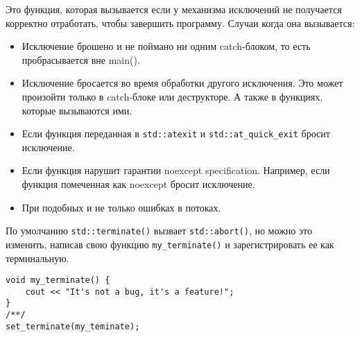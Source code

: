 Это функция, которая вызывается если у механизма исключений не получается корректно отработать, чтобы завершить программу.
Случаи когда она вызывается:
\begin{itemize}
\item Исключение брошено и не поймано ни одним catch-блоком, то есть пробрасывается вне main().
\item Исключение бросается во время обработки другого исключения. Это может произойти только в catch-блоке или деструкторе. А также в функциях, которые вызываются ими.
\item Если функция переданная в \texttt{std::atexit} и \texttt{std::at_quick_exit} бросит исключение.
\item Если функция нарушит гарантии noexcept specification. Например, если функция помеченная как noexcept бросит исключение.
\item При подобных и не только ошибках в потоках.
\end{itemize}

По умолчанию \texttt{std::terminate()} вызвает \texttt{std::abort()}, но можно это изменить, написав свою функцию \texttt{my_terminate()} и зарегистрировать ее как терминальную.
\begin{verbatim}
void my_terminate() {
    cout << "It's not a bug, it's a feature!";
}
/**/
set_terminate(my_teminate);
\end{verbatim}
